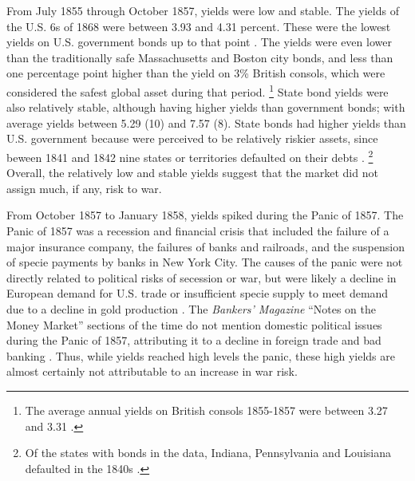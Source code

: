 \documentclass[11pt, oneside, article]{memoir}\usepackage[]{graphicx}\usepackage[]{color}
\begin{document}
From July 1855 through October 1857, yields were low and stable.
The yields of the U.S. 6s of 1868 were between 3.93 and 4.31 percent.
These were the lowest yields on U.S. government bonds up to that point \parencite[282-283]{HomerSylla2005}.
The yields were even lower than the traditionally safe Massachusetts and Boston city bonds, and less than one percentage point higher than the yield on 3\% British consols, which were considered the safest global asset during that period.%
\footnote{The average annual yields on British consols 1855-1857 were between 3.27 and 3.31 \parencite[193]{HomerSylla2005}.}
State bond yields were also relatively stable, although having higher yields than government bonds; with average yields between 5.29 (10) and 7.57 (8).
State bonds had higher yields than U.S. government because were perceived to be relatively riskier assets, since beween 1841 and 1842 nine states or territories defaulted on their debts \parencite{English1996}.%
\footnote{Of the states with bonds in the data, Indiana, Pennsylvania and Louisiana defaulted in the 1840s \parencite[265]{English1996}.}
Overall, the relatively low and stable yields suggest that the market did not assign much, if any, risk to war.

From October 1857 to January 1858, yields spiked during the Panic of 1857.
The Panic of 1857 was a recession and financial crisis that included the failure of a major insurance company, the failures of banks and railroads, and the suspension of specie payments by banks in New York City.
The causes of the panic were not directly related to political risks of secession or war, but were likely a decline in European demand for U.S. trade or insufficient specie supply to meet demand due to a decline in gold production \parencites[263-265]{Dewey1918}[277,299]{HomerSylla2005}[337]{BankersMagazine1857}.
The \textit{Bankers' Magazine} ``Notes on the Money Market'' sections of the time do not mention domestic political issues during the Panic of 1857, attributing it to a decline in foreign trade and bad banking \parencite[337]{BankersMagazine1857}.
Thus, while yields reached high levels the panic, these high yields are almost certainly not attributable to an increase in war risk.
\end{document}

